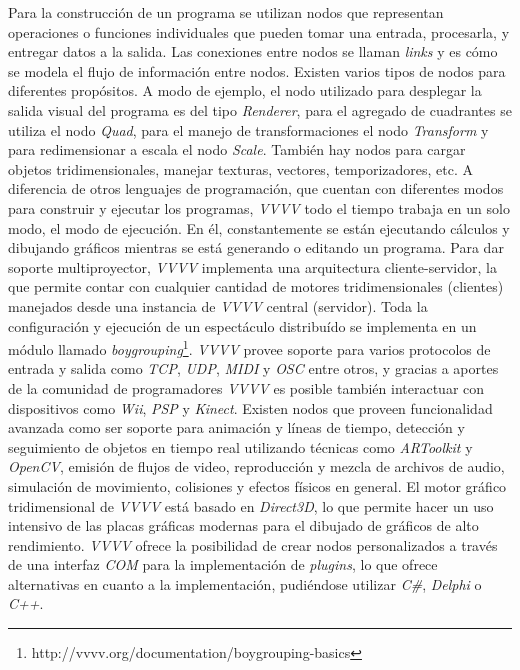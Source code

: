 Para la construcción de un programa se utilizan nodos que representan operaciones o funciones individuales que pueden tomar una entrada, procesarla, y entregar datos a la salida. Las conexiones entre nodos se llaman \emph{links} y es cómo se modela el flujo de información entre nodos.
Existen varios tipos de nodos para diferentes propósitos. A modo de ejemplo, el nodo utilizado para desplegar la salida visual del programa es del tipo \emph{Renderer}, para el agregado de cuadrantes se utiliza el nodo \emph{Quad}, para el manejo de transformaciones el nodo \emph{Transform} y para redimensionar a escala el nodo \emph{Scale}. También hay nodos para cargar objetos tridimensionales, manejar texturas, vectores, temporizadores, etc.
A diferencia de otros lenguajes de programación, que cuentan con diferentes modos para construir y ejecutar los programas, \emph{VVVV} todo el tiempo trabaja en un solo modo, el modo de ejecución. En él, constantemente se están ejecutando cálculos y dibujando gráficos mientras se está generando o editando un programa.
Para dar soporte multiproyector, \emph{VVVV} implementa una arquitectura cliente-servidor, la que permite contar con cualquier cantidad de motores tridimensionales (clientes) manejados desde una instancia de \emph{VVVV} central (servidor). Toda la configuración y ejecución de un espectáculo distribuído se implementa en un módulo llamado \emph{boygrouping}\footnote{http://vvvv.org/documentation/boygrouping-basics}.
\emph{VVVV} provee soporte para varios protocolos de entrada y salida como \emph{TCP}, \emph{UDP}, \emph{MIDI} y \emph{OSC} entre otros, y gracias a aportes de la comunidad de programadores \emph{VVVV} es posible también interactuar con dispositivos como \emph{Wii}, \emph{PSP} y \emph{Kinect}. Existen nodos que proveen funcionalidad avanzada como ser soporte para animación y líneas de tiempo, detección y seguimiento de objetos en tiempo real utilizando técnicas como \emph{ARToolkit} y \emph{OpenCV}, emisión de flujos de video, reproducción y mezcla de archivos de audio, simulación de movimiento, colisiones y efectos físicos en general.
El motor gráfico tridimensional de \emph{VVVV} está basado en \emph{Direct3D}, lo que permite hacer un uso intensivo de las placas gráficas modernas para el dibujado de gráficos de alto rendimiento.
\emph{VVVV} ofrece la posibilidad de crear nodos personalizados a través de una interfaz \emph{COM} para la implementación de \emph{plugins}, lo que ofrece alternativas en cuanto a la implementación, pudiéndose utilizar \emph{C\#}, \emph{Delphi} o \emph{C++}.


